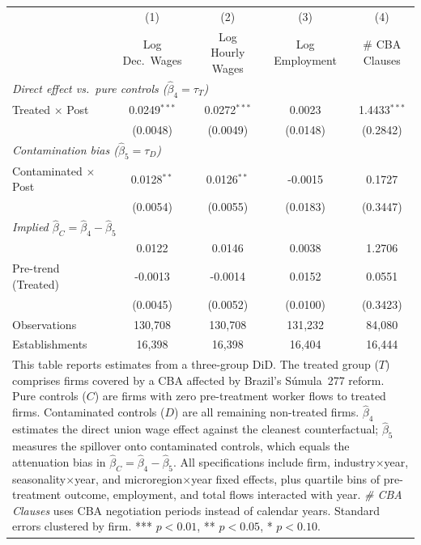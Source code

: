 \begin{table}[H]
\scriptsize
\centering
\begin{tabular}{lcccc}
\hline\hline
  & (1) & (2) & (3) & (4) \\

  & Log Dec.\ Wages & Log Hourly Wages & Log Employment & \# CBA Clauses \\

\hline
\multicolumn{5}{l}{\textit{Direct effect vs.\ pure controls ($\hat{\beta}_4 = \tau_T$)}} \\[3pt]
Treated $\times$ Post & 0.0249$^{***}$ & 0.0272$^{***}$ & 0.0023 & 1.4433$^{***}$ \\

 & (0.0048) & (0.0049) & (0.0148) & (0.2842) \\[4pt]

\multicolumn{5}{l}{\textit{Contamination bias ($\hat{\beta}_5 = \tau_D$)}} \\[3pt]
Contaminated $\times$ Post & 0.0128$^{**}$ & 0.0126$^{**}$ & -0.0015 & 0.1727 \\

 & (0.0054) & (0.0055) & (0.0183) & (0.3447) \\[4pt]

\multicolumn{5}{l}{\textit{Implied $\hat{\beta}_C = \hat{\beta}_4 - \hat{\beta}_5$}} \\[3pt]
 & 0.0122 & 0.0146 & 0.0038 & 1.2706 \\[4pt]

\hline
Pre-trend (Treated) & -0.0013 & -0.0014 & 0.0152 & 0.0551 \\

 & (0.0045) & (0.0052) & (0.0100) & (0.3423) \\

\hline
Observations & 130,708 & 130,708 & 131,232 & 84,080 \\

Establishments & 16,398 & 16,398 & 16,404 & 16,444 \\

\hline\hline
\multicolumn{5}{p{0.92\linewidth}}{\scriptsize This table reports estimates from a three-group DiD. The treated group ($T$) comprises firms covered by a CBA affected by Brazil's S\'{u}mula~277 reform. Pure controls ($C$) are firms with zero pre-treatment worker flows to treated firms. Contaminated controls ($D$) are all remaining non-treated firms. $\hat{\beta}_4$ estimates the direct union wage effect against the cleanest counterfactual; $\hat{\beta}_5$ measures the spillover onto contaminated controls, which equals the attenuation bias in $\hat{\beta}_C = \hat{\beta}_4 - \hat{\beta}_5$. All specifications include firm, industry$\times$year, seasonality$\times$year, and microregion$\times$year fixed effects, plus quartile bins of pre-treatment outcome, employment, and total flows interacted with year. \textit{\# CBA Clauses} uses CBA negotiation periods instead of calendar years. Standard errors clustered by firm. *** $p<0.01$, ** $p<0.05$, * $p<0.10$.}
\end{tabular}
\end{table}
